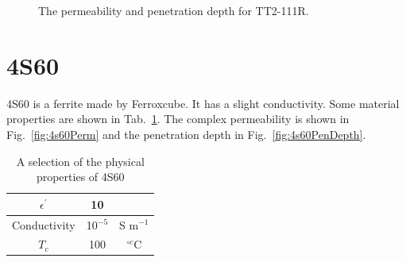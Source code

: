 \begin{figure}
\caption{The permeability  and penetration depth  for TT2-111R.}
\end{figure}

\section{4S60}

4S60 is a ferrite made by Ferroxcube. It has a slight conductivity. Some material properties are shown in Tab.~\ref{tab:4s60Prop}. The complex permeability is shown in Fig.~\ref{fig:4s60Perm} and the penetration depth in Fig.~\ref{fig:4s60PenDepth}.

\begin{table}
\caption{A selection of the physical properties of 4S60}
\label{tab:4s60Prop}
\begin{center}
\begin{tabular}{c | c | c}
$\epsilon^{'}$ & 10 & \\ \hline
Conductivity  & 10$^{-5}$ & S m$^{-1}$\\ \hline
$T_{c}$ & 100 & $^{\circ c}$C \\
\end{tabular}
\end{center}
\end{table}

